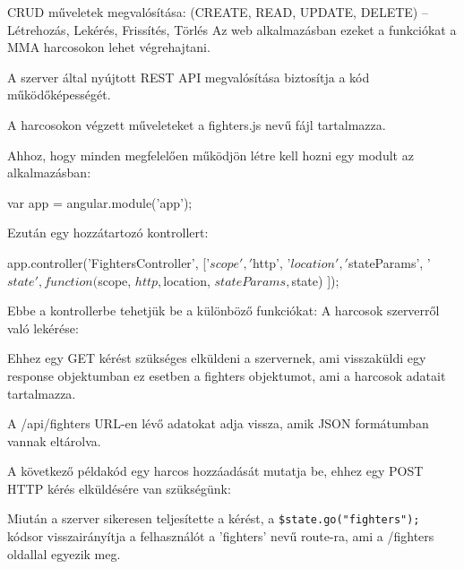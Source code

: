 
CRUD műveletek megvalósítása: (CREATE, READ, UPDATE, DELETE) – Létrehozás, Lekérés, Frissítés, Törlés
Az web alkalmazásban ezeket a funkciókat a MMA harcosokon lehet végrehajtani.

A szerver által nyújtott REST API megvalósítása biztosítja a kód működőképességét.

A harcosokon végzett műveleteket a fighters.js nevű fájl tartalmazza.

Ahhoz, hogy minden megfelelően működjön létre kell hozni egy modult az alkalmazásban:

\begin{cpp}
var app = angular.module('app');
\end{cpp}

Ezután egy hozzátartozó kontrollert:

\begin{cpp}
app.controller('FightersController', ['$scope', '$http', '$location', '$stateParams',  '$state', function($scope, $http, $location, $stateParams, $state){
}]);
\end{cpp}

Ebbe a kontrollerbe tehetjük be a különböző funkciókat: A harcosok szerverről való lekérése:


Ehhez egy GET kérést szükséges elküldeni a szervernek, ami visszaküldi egy response objektumban ez esetben a fighters objektumot, ami a harcosok adatait tartalmazza.

A /api/fighters URL-en lévő adatokat adja vissza, amik JSON formátumban vannak eltárolva.

A következő példakód egy harcos hozzáadását mutatja be, ehhez egy POST HTTP kérés elküldésére van szükségünk:


Miután a szerver sikeresen teljesítette a kérést, a \texttt{\$state.go("fighters");} kódsor
visszairányítja a felhasználót a ’fighters’ nevű route-ra, ami a /fighters oldallal egyezik meg.

